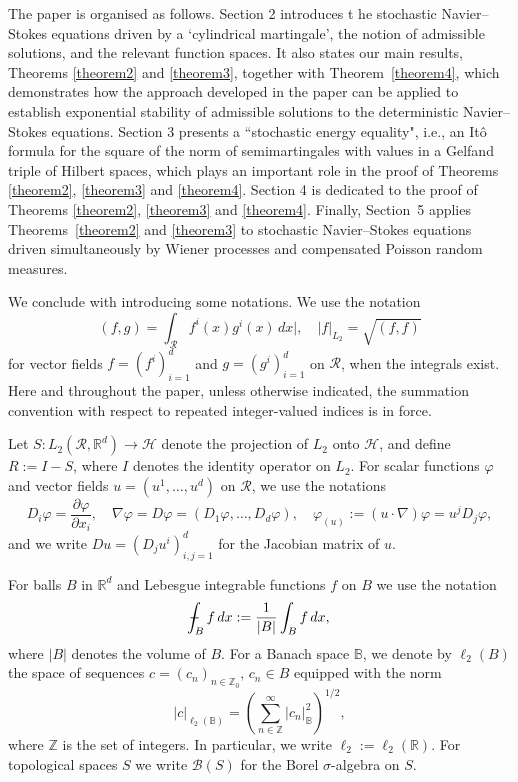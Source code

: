 \documentclass[11pt,reqno]{amsart}
\theoremstyle{definition}
\theoremstyle{remark}
\newcommand\bR{\mathbb{R}}
\newcommand\bB{\mathbb{B}}
\newcommand\bZ{\mathbb{Z}}
\newcommand\cH{\mathcal{H}}
\newcommand\cR{\mathcal{R}}
\newcommand{\<}{\langle}
\renewcommand{\>}{\rangle}
\def\Xint#1{\mathchoice
{\XXint\displaystyle\textstyle{#1}}%
{\XXint\textstyle\scriptstyle{#1}}%
{\XXint\scriptstyle\scriptscriptstyle{#1}}%
{\XXint\scriptscriptstyle\scriptscriptstyle{#1}}%
\!\int}
\def\XXint#1#2#3{{\setbox0=\hbox{$#1{#2#3}{\int}$ }
\vcenter{\hbox{$#2#3$ }}\kern-.6\wd0}}
\def\dashint{\Xint-}
\begin{document}
The paper is organised as follows. Section 2 introduces t
he stochastic Navier--Stokes equations driven 
by a `cylindrical martingale', the notion of admissible solutions, 
and the relevant function spaces. It also states our main results, 
Theorems \ref{theorem2} and \ref{theorem3}, 
together with Theorem~\ref{theorem4}, 
which demonstrates how the approach developed 
in the paper can be applied to establish exponential stability of admissible solutions 
to the deterministic Navier--Stokes equations. 
Section 3 presents a ``stochastic energy equality", 
i.e., an It\^o formula for the square of the norm 
of semimartingales with values in a Gelfand triple of Hilbert spaces, 
which plays an important role 
in the proof of Theorems \ref{theorem2}, \ref{theorem3} 
and \ref{theorem4}. 
Section 4 is dedicated to the proof of Theorems \ref{theorem2}, 
\ref{theorem3} and \ref{theorem4}. 
Finally, Section~5 applies Theorems~\ref{theorem2} and \ref{theorem3} 
to stochastic Navier--Stokes equations driven simultaneously 
by Wiener processes and compensated Poisson random measures.


We conclude with introducing some notations. 
We use the notation 
$$
(f,g)=\int_{\cR}f^i(x)g^i(x)\,dx|, \quad |f|_{L_2}=\sqrt{(f,f)} 
$$
for vector fields $f=(f^i)_{i=1}^d$ and $g=(g^i)_{i=1}^d$ on $\cR$, when 
the integrals exist.  
Here and throughout the paper, unless otherwise indicated, 
the summation convention with respect to repeated integer-valued 
indices is in force.  

 Let
$S: L_2(\cR, \bR^d)\to\cH$
denote the projection of $L_2$ onto $\mathcal{H}$, and define
$R:=I-S$, 
where $I$ denotes the identity operator on 
$L_2$. For scalar functions $\varphi$ and vector fields
$u=(u^1,\dots,u^d)$
on $\cR$, we use the notations 
$$
D_i\varphi=\frac{\partial \varphi}{\partial x_i},
\quad
\nabla \varphi=D\varphi=(D_1\varphi,\dots,D_d\varphi), 
\quad \varphi_{(u)}:=(u\cdot\nabla)\varphi=u^jD_j\varphi,
$$
and we write $Du=(D_j u^i)_{i,j=1}^d$ for  the Jacobian matrix of $u$. 

For balls $B$ in $\bR^{d}$ and Lebesgue integrable 
functions $f$ on $B$ 
we use the notation 
$$
\dashint_{B}f\,dx:=\frac{1}{|B|}\int_{B}f\,dx, 
$$        
where $|B|$ denotes the volume of $B$. 
For a Banach space $\bB$, we denote by
$\ell_2(B)$
the space of sequences
$c=(c_n)_{n\in\bZ_0}, \, c_n\in B$ equipped with the norm
$$
|c|_{\ell_2(\bB)}=\left(
\sum_{n\in \bZ}^\infty |c_n|_{\bB}^2\right)^{1/2}, 
$$ 
where $\bZ$ is the set of integers. 
In particular, we write $\ell_2:=\ell_2(\mathbb{R})$. 
For topological spaces $S$ we write $\mathcal{B}(S)$  
for the Borel $\sigma$-algebra on $S$.
\end{document}
